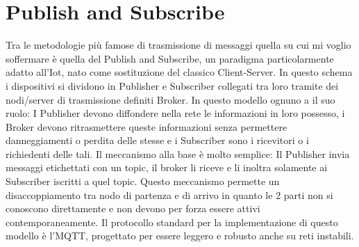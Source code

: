 \documentclass[12pt,a4paper,openright,twoside]{report}
\begin{document}
	\section{Publish and Subscribe}
	Tra le metodologie più famose di trasmissione di messaggi quella su cui mi voglio soffermare è quella del Publish and Subscribe, un paradigma particolarmente adatto all'Iot, nato come sostituzione del classico Client-Server. In questo schema i dispositivi si dividono in Publisher e Subscriber collegati tra loro tramite dei nodi/server di trasmissione definiti Broker.
	In questo modello ognuno a il suo ruolo: I Publisher devono diffondere nella rete le informazioni in loro possesso, i Broker devono ritrasmettere queste informazioni senza permettere danneggiamenti o perdita delle stesse e i Subscriber sono i ricevitori o i richiedenti delle tali.
	Il meccanismo alla base è molto semplice: Il Publisher invia messaggi etichettati con un topic, il broker li riceve e li inoltra solamente ai Subscriber iscritti a quel topic. Questo meccanismo permette un disaccoppiamento tra nodo di partenza e di arrivo in quanto le 2 parti non si conoscono direttamente e non devono per forza essere attivi contemporaneamente.
	Il protocollo standard per la implementazione di questo modello è l'MQTT, progettato per essere leggero e robusto anche su reti instabili.
	
	
	
	
	
	
	
\end{document}
